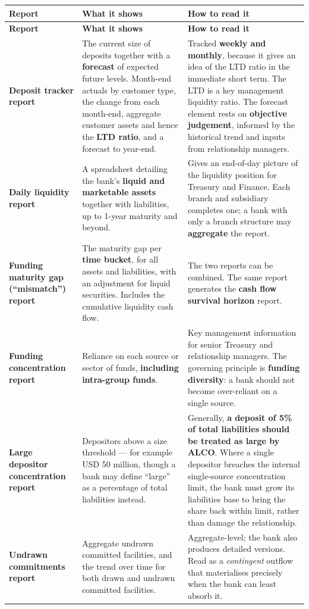 \begin{center}
\scriptsize
\begin{longtable}{@{}p{3.3cm} p{5.9cm} p{5.0cm}@{}}
\toprule
\rowcolor{FRMSoft}\textbf{Report} & \textbf{What it shows} & \textbf{How to read it} \\
\midrule
\endfirsthead
\toprule
\rowcolor{FRMSoft}\textbf{Report} & \textbf{What it shows} & \textbf{How to read it} \\
\midrule
\endhead
\textbf{Deposit tracker report} &
The current size of deposits together with a \textbf{forecast} of expected future levels. Month-end actuals by customer type, the change from each month-end, aggregate customer assets and hence the \textbf{LTD ratio}, and a forecast to year-end. &
Tracked \textbf{weekly and monthly}, because it gives an idea of the LTD ratio in the immediate short term. The LTD is a key management liquidity ratio. The forecast element rests on \textbf{objective judgement}, informed by the historical trend and inputs from relationship managers. \\
\addlinespace
\textbf{Daily liquidity report} &
A spreadsheet detailing the bank's \textbf{liquid and marketable assets} together with liabilities, up to 1-year maturity and beyond. &
Gives an end-of-day picture of the liquidity position for Treasury and Finance. Each branch and subsidiary completes one; a bank with only a branch structure may \textbf{aggregate} the report. \\
\addlinespace
\textbf{Funding maturity gap (``mismatch'') report} &
The maturity gap per \textbf{time bucket}, for all assets and liabilities, with an adjustment for liquid securities. Includes the cumulative liquidity cash flow. &
The two reports can be combined. The same report generates the \textbf{cash flow survival horizon} report. \\
\addlinespace
\textbf{Funding concentration report} &
Reliance on each source or sector of funds, \textbf{including intra-group funds}. &
Key management information for senior Treasury and relationship managers. The governing principle is \textbf{funding diversity}: a bank should not become over-reliant on a single source. \\
\addlinespace
\textbf{Large depositor concentration report} &
Depositors above a size threshold --- for example USD 50 million, though a bank may define ``large'' as a percentage of total liabilities instead. &
Generally, \textbf{a deposit of 5\% of total liabilities should be treated as large by ALCO}. Where a single depositor breaches the internal single-source concentration limit, the bank must grow its liabilities base to bring the share back within limit, rather than damage the relationship. \\
\addlinespace
\textbf{Undrawn commitments report} &
Aggregate undrawn committed facilities, and the trend over time for both drawn and undrawn committed facilities. &
Aggregate-level; the bank also produces detailed versions. Read as a \emph{contingent} outflow that materialises precisely when the bank can least absorb it. \\
\bottomrule
\end{longtable}
\end{center}

